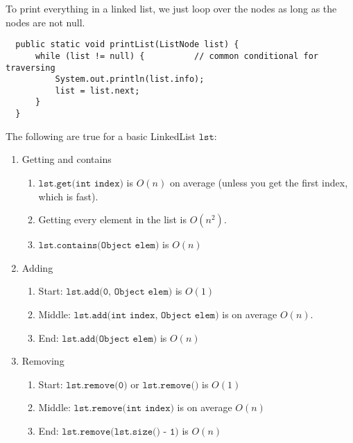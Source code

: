   To print everything in a linked list, we just loop over the nodes as long as the nodes are not null. 
  \begin{lstlisting}
  public static void printList(ListNode list) {
      while (list != null) {          // common conditional for traversing 
          System.out.println(list.info); 
          list = list.next; 
      }
  }
  \end{lstlisting}

  \begin{theorem}
  The following are true for a basic LinkedList $\texttt{lst}$:  
  \begin{enumerate}
      \item Getting and contains 
      \begin{enumerate}
          \item $\texttt{lst.get(int index)}$ is $O(n)$ on average (unless you get the first index, which is fast).  
          \item Getting every element in the list is $O(n^2)$. 
          \item $\texttt{lst.contains(Object elem)}$ is $O(n)$ 
      \end{enumerate}
      
      \item Adding 
      \begin{enumerate}
          \item Start:  $\texttt{lst.add(0, Object elem)}$ is $O(1)$ 
          \item Middle: $\texttt{lst.add(int index, Object elem)}$ is on average $O(n)$. 
          \item End:    $\texttt{lst.add(Object elem)}$ is $O(n)$
      \end{enumerate}
      
      \item Removing 
      \begin{enumerate}
          \item Start:  $\texttt{lst.remove(0)}$ or $\texttt{lst.remove()}$ is $O(1)$ 
          \item Middle: $\texttt{lst.remove(int index)}$ is on average $O(n)$ 
          \item End:    $\texttt{lst.remove(lst.size() - 1)}$ is $O(n)$ 
      \end{enumerate}
  \end{enumerate}
  \end{theorem}
